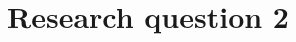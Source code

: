 \documentclass[../main]{subfiles}
\begin{document}
\chapter{Research question 2}
\label{ch:reserach_question2}

\end{document}
